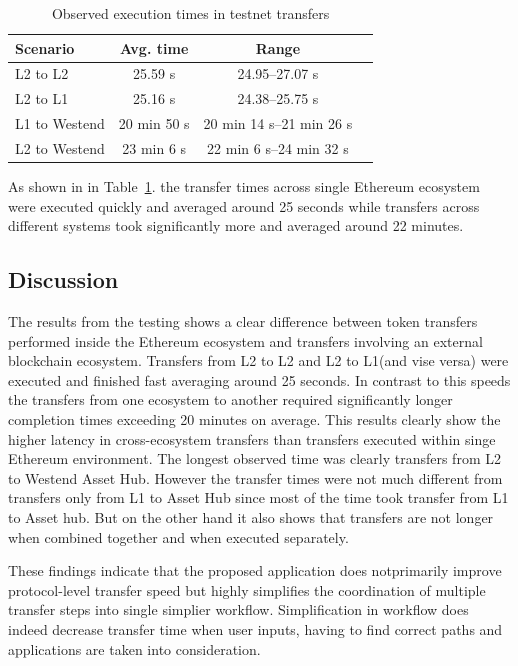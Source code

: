 \documentclass[conference]{IEEEtran}
\begin{document}
\begin{table}[H]
\centering
\caption{Observed execution times in testnet transfers}
\label{tab:testnet-execution-times}
\begin{tabular}{lccc}
\hline
Scenario & Avg. time & Range \\
\hline
L2 to L2 & 25.59 s & 24.95--27.07 s \\
L2 to L1 & 25.16 s & 24.38--25.75 s \\
L1 to Westend & 20 min 50 s & 20 min 14 s--21 min 26 s \\
L2 to Westend & 23 min 6 s & 22 min 6 s--24 min 32 s \\
\hline
\end{tabular}
\end{table}

As shown in in Table~\ref{tab:testnet-execution-times}. the transfer times across single Ethereum ecosystem were executed quickly and averaged around 25 seconds while transfers across different systems took significantly more and averaged around 22 minutes.

\subsection{Discussion}

The results from the testing shows a clear difference between token transfers performed inside the Ethereum ecosystem and transfers involving an external blockchain ecosystem. Transfers from L2 to L2 and L2 to L1(and vise versa) were executed and finished fast averaging around 25 seconds.
In contrast to this speeds the transfers from one ecosystem to another required significantly longer completion times exceeding 20 minutes on average. This results clearly show the higher latency in cross-ecosystem transfers than transfers executed within singe Ethereum environment.
The longest observed time was clearly transfers from L2 to Westend Asset Hub. However the transfer times were not much different from transfers only from L1 to Asset Hub since most of the time took transfer from L1 to Asset hub. But on the other hand it also shows that transfers are not longer when combined together and when executed separately.

These findings indicate that the proposed application does notprimarily improve protocol-level transfer speed but highly simplifies the coordination of multiple transfer steps into single simplier workflow. Simplification in workflow does indeed decrease transfer time when user inputs, having to find correct paths and applications are taken into consideration.
\end{document}
